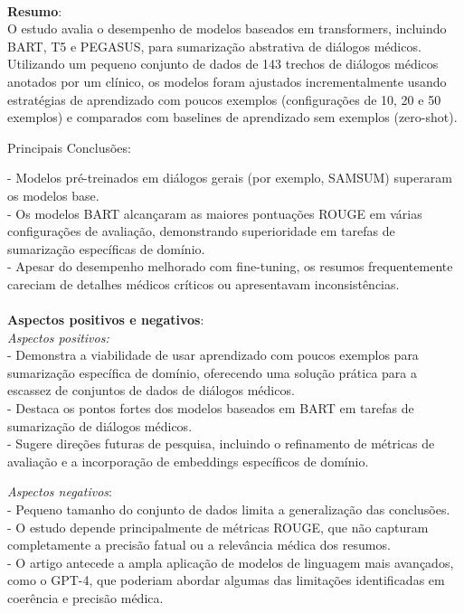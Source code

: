 \documentclass[
	article,
	11pt,
	oneside,
	a4paper,
	english,
	brazil,
	sumario=tradicional
	]{abntex2}
\begin{document}
\begin{enumerate}
\\
\textbf{Resumo}:
\\
O estudo avalia o desempenho de modelos baseados em transformers, incluindo BART, T5 e PEGASUS, para sumarização abstrativa de diálogos médicos. Utilizando um pequeno conjunto de dados de 143 trechos de diálogos médicos anotados por um clínico, os modelos foram ajustados incrementalmente usando estratégias de aprendizado com poucos exemplos (configurações de 10, 20 e 50 exemplos) e comparados com baselines de aprendizado sem exemplos (zero-shot).

Principais Conclusões:

- Modelos pré-treinados em diálogos gerais (por exemplo, SAMSUM) superaram os modelos base.\\
- Os modelos BART alcançaram as maiores pontuações ROUGE em várias configurações de avaliação, demonstrando superioridade em tarefas de sumarização específicas de domínio.\\
- Apesar do desempenho melhorado com fine-tuning, os resumos frequentemente careciam de detalhes médicos críticos ou apresentavam inconsistências.
\\ \\
\textbf{Aspectos positivos e negativos}:\\
\textit{Aspectos positivos:} \\
- Demonstra a viabilidade de usar aprendizado com poucos exemplos para sumarização específica de domínio, oferecendo uma solução prática para a escassez de conjuntos de dados de diálogos médicos.\\
- Destaca os pontos fortes dos modelos baseados em BART em tarefas de sumarização de diálogos médicos. \\
- Sugere direções futuras de pesquisa, incluindo o refinamento de métricas de avaliação e a incorporação de embeddings específicos de domínio.

\textit{Aspectos negativos}:\\
- Pequeno tamanho do conjunto de dados limita a generalização das conclusões. \\
- O estudo depende principalmente de métricas ROUGE, que não capturam completamente a precisão fatual ou a relevância médica dos resumos.\\
- O artigo antecede a ampla aplicação de modelos de linguagem mais avançados, como o GPT-4, que poderiam abordar algumas das limitações identificadas em coerência e precisão médica.


\end{enumerate}
\end{document}
